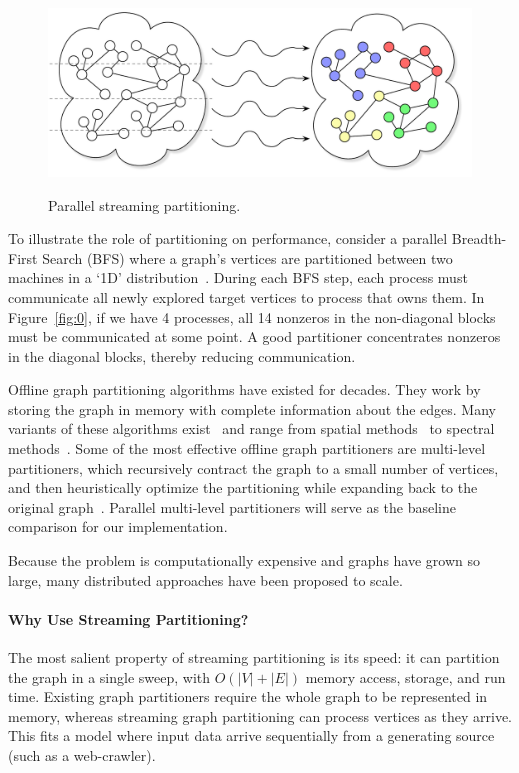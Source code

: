 \begin{figure}[ht]
\centering
  \includegraphics[width=0.7\columnwidth]{figures/coverfig.pdf}
  \label{fig:coverfig}
  \caption{Parallel streaming partitioning.}
\end{figure}

To illustrate the role of partitioning on performance, consider a parallel Breadth-First Search (BFS) where a graph's vertices are partitioned between two machines in a `1D' distribution~\cite{Buluc2D}. During each BFS step, each process must communicate all newly explored target vertices to process that owns them. In Figure~\ref{fig:0}, if we have 4 processes, all 14 nonzeros in the non-diagonal blocks must be communicated at some point.
A good partitioner concentrates nonzeros in the diagonal blocks, thereby reducing communication.

Offline graph partitioning algorithms have existed for decades. They work by storing the graph in memory with complete information about the edges. Many variants of these algorithms exist~\cite{gpsurvey} and range from spatial methods~\cite{Gilbert95geometricmesh} to spectral methods~\cite{arora2009expander}. Some of the most effective offline graph partitioners are multi-level partitioners, which recursively contract the graph to a small number of vertices, and then heuristically optimize the partitioning while expanding back to the original graph~\cite{karypis1998multilevel}. Parallel multi-level partitioners will serve as the baseline comparison for our implementation. 

Because the problem is computationally expensive and graphs have grown so large, many distributed approaches have been proposed to scale.
 

\paragraph{Why Use Streaming Partitioning?}
The most salient property of streaming partitioning is its speed: it can partition the graph in a single sweep, with $O(|V| + |E|)$ memory access, storage, and run time. Existing graph partitioners require the whole graph to be represented in memory, whereas streaming graph partitioning can process vertices as they arrive. This fits a model where input data arrive sequentially from a generating source (such as a web-crawler).

